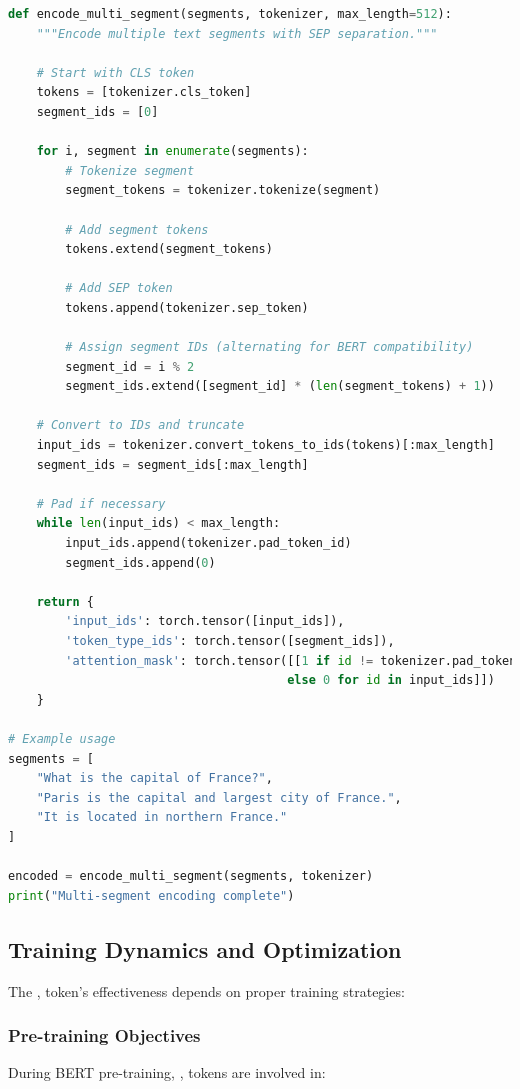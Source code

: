 \begin{lstlisting}[language=Python, caption=Multi-Segment Processing]
def encode_multi_segment(segments, tokenizer, max_length=512):
    """Encode multiple text segments with SEP separation."""
    
    # Start with CLS token
    tokens = [tokenizer.cls_token]
    segment_ids = [0]
    
    for i, segment in enumerate(segments):
        # Tokenize segment
        segment_tokens = tokenizer.tokenize(segment)
        
        # Add segment tokens
        tokens.extend(segment_tokens)
        
        # Add SEP token
        tokens.append(tokenizer.sep_token)
        
        # Assign segment IDs (alternating for BERT compatibility)
        segment_id = i % 2
        segment_ids.extend([segment_id] * (len(segment_tokens) + 1))
    
    # Convert to IDs and truncate
    input_ids = tokenizer.convert_tokens_to_ids(tokens)[:max_length]
    segment_ids = segment_ids[:max_length]
    
    # Pad if necessary
    while len(input_ids) < max_length:
        input_ids.append(tokenizer.pad_token_id)
        segment_ids.append(0)
    
    return {
        'input_ids': torch.tensor([input_ids]),
        'token_type_ids': torch.tensor([segment_ids]),
        'attention_mask': torch.tensor([[1 if id != tokenizer.pad_token_id 
                                       else 0 for id in input_ids]])
    }

# Example usage
segments = [
    "What is the capital of France?",
    "Paris is the capital and largest city of France.",
    "It is located in northern France."
]

encoded = encode_multi_segment(segments, tokenizer)
print("Multi-segment encoding complete")
\end{lstlisting}

\subsection{Training Dynamics and Optimization}

The \sep{} token's effectiveness depends on proper training strategies:

\subsubsection{Pre-training Objectives}
During BERT pre-training, \sep{} tokens are involved in:

